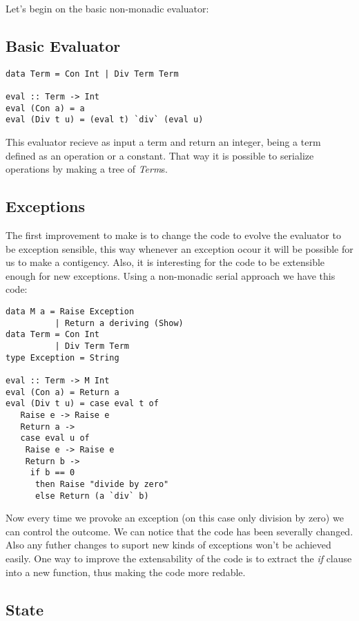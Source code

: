 \documentclass[twocolumn,10pt]{article}
\begin{document}
Let's begin on the basic non-monadic evaluator:

\subsection{Basic Evaluator}

\lstset{language=Haskell}
\begin{lstlisting}
data Term = Con Int | Div Term Term

eval :: Term -> Int
eval (Con a) = a
eval (Div t u) = (eval t) `div` (eval u)
\end{lstlisting}

This evaluator recieve as input a term and return an integer, being a term defined as an operation or a constant. That way it is possible to serialize operations by making a tree of \textit{Term}s. 

\subsection{Exceptions}

The first improvement to make is to change the code to evolve the evaluator to be exception sensible, this way whenever an exception ocour it will be possible for us to make a contigency. Also, it is interesting for the code to be extensible enough for new exceptions. Using a non-monadic serial approach we have this code:

\lstset{language=Haskell}
\begin{lstlisting}
data M a = Raise Exception
          | Return a deriving (Show)
data Term = Con Int 
          | Div Term Term
type Exception = String

eval :: Term -> M Int
eval (Con a) = Return a
eval (Div t u) = case eval t of
   Raise e -> Raise e
   Return a -> 
   case eval u of
	Raise e -> Raise e
	Return b ->
	 if b == 0
	  then Raise "divide by zero"
	  else Return (a `div` b)
\end{lstlisting}

Now every time we provoke an exception (on this case only division by zero) we can control the outcome. We can notice that the code has been severally changed. Also any futher changes to suport new kinds of exceptions won't be achieved easily. One way to improve the extensability of the code is to extract the \textit{if} clause into a new function, thus making the code more redable.

\subsection{State}
\end{document}

